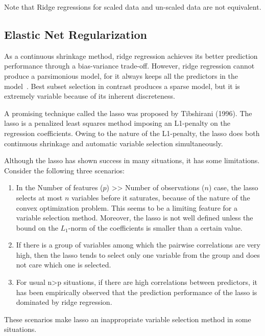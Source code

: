 Note that Ridge regressions for scaled data and un-scaled data are not equivalent.

\subsection{Elastic Net Regularization} %
\label{ssub:elastic_net_regularization}
As a continuous shrinkage method, ridge regression achieves its better prediction performance through a bias-variance trade-off. However, ridge regression cannot produce a parsimonious model, for it always keeps all the predictors in the model~\cite{zou2005}. Best subset selection in contrast produces a sparse model, but it is extremely variable because of its inherent discreteness. 

A promising technique called the lasso was proposed by Tibshirani (1996). The 
lasso is a penalized least squares method imposing an L1-penalty on the 
regression coefficients. Owing to the nature of the L1-penalty, the lasso does 
both continuous shrinkage and automatic variable selection simultaneously.

Although the lasso has shown success in many situations, it has some
limitations. Consider the following three scenarios:
\begin{enumerate}

    \item In the Number of features ($p$) >> Number of observations ($n$) case, the
    lasso selects at most $n$ variables before it saturates, because of the
    nature of the convex optimization problem. This seems to be a limiting
    feature for a variable selection method. Moreover, the lasso is not well
    defined unless the bound on the $L_1$-norm of the coefficients is smaller
    than a certain value.

    \item If there is a group of variables among which the pairwise correlations are
    very high, then the lasso tends to select only one variable from the group
    and does not care which one is selected.

    \item For usual n>p situations, if there are high correlations between predictors,
    it has been empirically observed that the prediction performance of the
    lasso is dominated by ridge regression.

\end{enumerate}

These scenarios make lasso an inappropriate variable selection method in some situations.

